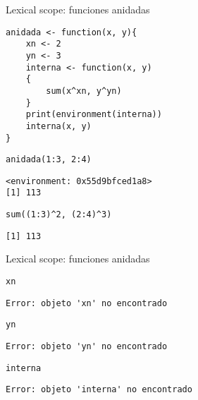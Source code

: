 \documentclass[xcolor={usenames,svgnames,dvipsnames}]{beamer}
\begin{document}
\begin{frame}[label={sec:org19af8fd},fragile]{Lexical scope: funciones anidadas}
 \lstset{language=r,label= ,caption= ,captionpos=b,numbers=none}
\begin{lstlisting}
anidada <- function(x, y){
    xn <- 2
    yn <- 3
    interna <- function(x, y)
    {
        sum(x^xn, y^yn)
    }
    print(environment(interna))
    interna(x, y)
}
\end{lstlisting}

\lstset{language=r,label= ,caption= ,captionpos=b,numbers=none}
\begin{lstlisting}
anidada(1:3, 2:4)
\end{lstlisting}

\begin{verbatim}
<environment: 0x55d9bfced1a8>
[1] 113
\end{verbatim}


\lstset{language=r,label= ,caption= ,captionpos=b,numbers=none}
\begin{lstlisting}
sum((1:3)^2, (2:4)^3)
\end{lstlisting}

\begin{verbatim}
[1] 113
\end{verbatim}
\end{frame}

\begin{frame}[label={sec:org0dfa012},fragile]{Lexical scope: funciones anidadas}
 \lstset{language=r,label= ,caption= ,captionpos=b,numbers=none}
\begin{lstlisting}
xn
\end{lstlisting}

\begin{verbatim}
Error: objeto 'xn' no encontrado
\end{verbatim}


\lstset{language=r,label= ,caption= ,captionpos=b,numbers=none}
\begin{lstlisting}
yn
\end{lstlisting}

\begin{verbatim}
Error: objeto 'yn' no encontrado
\end{verbatim}


\lstset{language=r,label= ,caption= ,captionpos=b,numbers=none}
\begin{lstlisting}
interna
\end{lstlisting}

\begin{verbatim}
Error: objeto 'interna' no encontrado
\end{verbatim}
\end{frame}
\end{document}
